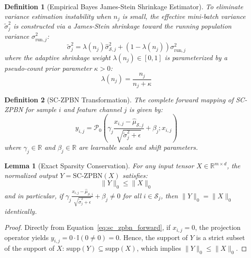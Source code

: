 \documentclass[twocolumn,10pt]{article}
\newtheorem{lemma}{Lemma}
\newtheorem{definition}{Definition}
\begin{document}
\begin{definition}[Empirical Bayes James-Stein Shrinkage Estimator]
To eliminate variance estimation instability when $n_j$ is small, the effective mini-batch variance $\tilde{\sigma}_j^2$ is constructed via a James-Stein shrinkage toward the running population variance $\sigma_{\mathrm{run}, j}^2$:
\begin{equation}
\label{eq:shrinkage_var}
\tilde{\sigma}_j^2 = \lambda(n_j) \hat{\sigma}_{\mathcal{S}, j}^2 + (1 - \lambda(n_j)) \sigma_{\mathrm{run}, j}^2
\end{equation}
where the adaptive shrinkage weight $\lambda(n_j) \in [0, 1]$ is parameterized by a pseudo-count prior parameter $\kappa > 0$:
\begin{equation}
\lambda(n_j) = \frac{n_j}{n_j + \kappa}
\end{equation}
\end{definition}

\begin{definition}[SC-ZPBN Transformation]
The complete forward mapping of SC-ZPBN for sample $i$ and feature channel $j$ is given by:
\begin{equation}
\label{eq:sc_zpbn_forward}
y_{i,j} = \mathcal{P}_0\left( \gamma_j \frac{x_{i,j} - \hat{\mu}_{\mathcal{S}, j}}{\sqrt{\tilde{\sigma}_j^2 + \epsilon}} + \beta_j ; x_{i,j} \right)
\end{equation}
where $\gamma_j \in \mathbb{R}$ and $\beta_j \in \mathbb{R}$ are learnable scale and shift parameters.
\end{definition}

\begin{lemma}[Exact Sparsity Conservation]
\label{lem:sparsity_conservation}
For any input tensor $X \in \mathbb{R}^{m \times d}$, the normalized output $Y = \mathrm{SC\text{-}ZPBN}(X)$ satisfies:
\begin{equation}
\|Y\|_0 \le \|X\|_0
\end{equation}
and in particular, if $\gamma_j \frac{x_{i,j} - \hat{\mu}_{\mathcal{S},j}}{\sqrt{\tilde{\sigma}_j^2 + \epsilon}} + \beta_j \neq 0$ for all $i \in \mathcal{S}_j$, then $\|Y\|_0 = \|X\|_0$ identically.
\end{lemma}
\begin{proof}
Directly from Equation~\eqref{eq:sc_zpbn_forward}, if $x_{i,j} = 0$, the projection operator yields $y_{i,j} = 0 \cdot \mathbb{I}(0 \neq 0) = 0$. Hence, the support of $Y$ is a strict subset of the support of $X$: $\mathrm{supp}(Y) \subseteq \mathrm{supp}(X)$, which implies $\|Y\|_0 \le \|X\|_0$.
\end{proof}
\end{document}
